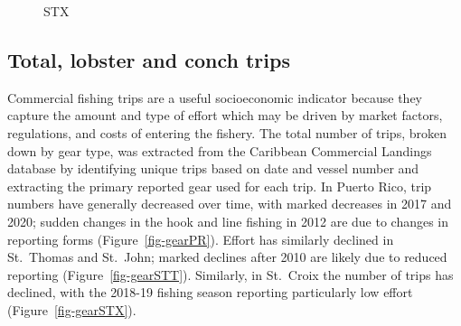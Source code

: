 \documentclass[
  letterpaper,
  oneside,
  open=any]{scrbook}
\begin{document}
\begin{figure}


\caption{\label{fig-perlandSTX}STX}

\end{figure}%

\subsection{Total, lobster and conch
trips}\label{total-lobster-and-conch-trips}

Commercial fishing trips are a useful socioeconomic indicator because
they capture the amount and type of effort which may be driven by market
factors, regulations, and costs of entering the fishery. The total
number of trips, broken down by gear type, was extracted from the
Caribbean Commercial Landings database by identifying unique trips based
on date and vessel number and extracting the primary reported gear used
for each trip. In Puerto Rico, trip numbers have generally decreased
over time, with marked decreases in 2017 and 2020; sudden changes in the
hook and line fishing in 2012 are due to changes in reporting forms
(Figure~\ref{fig-gearPR}). Effort has similarly declined in St.~Thomas
and St.~John; marked declines after 2010 are likely due to reduced
reporting (Figure~\ref{fig-gearSTT}). Similarly, in St.~Croix the number
of trips has declined, with the 2018-19 fishing season reporting
particularly low effort (Figure~\ref{fig-gearSTX}).
\end{document}
